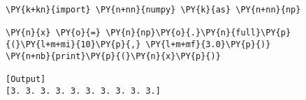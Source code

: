 \begin{Verbatim}[label=\makebox{\href{https://bitbucket.org/lbaldini/statnotes/src/master/snippets/np.full.py}{https://bitbucket.org/.../np.full.py}},commandchars=\\\{\}]
\PY{k+kn}{import} \PY{n+nn}{numpy} \PY{k}{as} \PY{n+nn}{np}

\PY{n}{x} \PY{o}{=} \PY{n}{np}\PY{o}{.}\PY{n}{full}\PY{p}{(}\PY{l+m+mi}{10}\PY{p}{,} \PY{l+m+mf}{3.0}\PY{p}{)}
\PY{n+nb}{print}\PY{p}{(}\PY{n}{x}\PY{p}{)}

[Output]
[3. 3. 3. 3. 3. 3. 3. 3. 3. 3.]
\end{Verbatim}